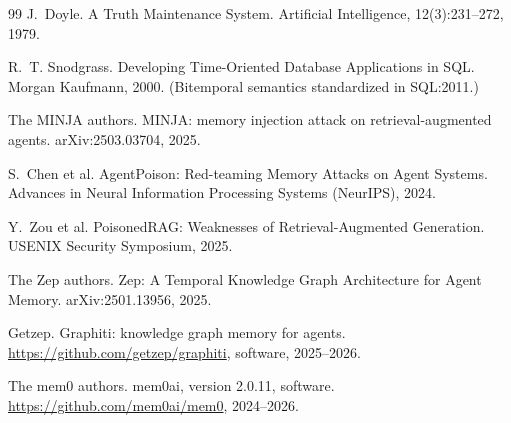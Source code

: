 \documentclass[11pt]{article}
\begin{document}
\begin{thebibliography}{99}
 J.~Doyle.
\newblock A Truth Maintenance System.
\newblock Artificial Intelligence, 12(3):231--272, 1979.

 R.~T. Snodgrass.
\newblock Developing Time-Oriented Database Applications in SQL.
\newblock Morgan Kaufmann, 2000. (Bitemporal semantics standardized in SQL:2011.)

 The MINJA authors.
\newblock MINJA: memory injection attack on retrieval-augmented agents.
\newblock arXiv:2503.03704, 2025.

 S.~Chen et al.
\newblock AgentPoison: Red-teaming Memory Attacks on Agent Systems.
\newblock Advances in Neural Information Processing Systems (NeurIPS), 2024.

 Y.~Zou et al.
\newblock PoisonedRAG: Weaknesses of Retrieval-Augmented Generation.
\newblock USENIX Security Symposium, 2025.

 The Zep authors.
\newblock Zep: A Temporal Knowledge Graph Architecture for Agent Memory.
\newblock arXiv:2501.13956, 2025.

 Getzep.
\newblock Graphiti: knowledge graph memory for agents.
\newblock \url{https://github.com/getzep/graphiti}, software, 2025--2026.

 The mem0 authors.
\newblock mem0ai, version 2.0.11, software.
\newblock \url{https://github.com/mem0ai/mem0}, 2024--2026.

\end{thebibliography}
\end{document}
